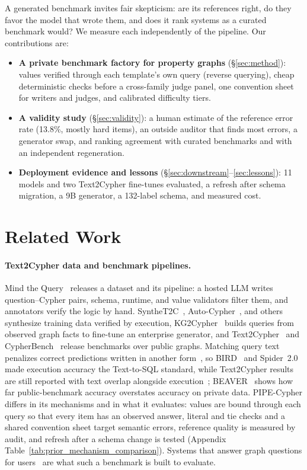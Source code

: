 \documentclass[11pt]{article}
\begin{document}
A generated benchmark invites fair skepticism: are its references right, do they favor the model that wrote them, and does it rank systems as a curated benchmark would? We measure each independently of the pipeline. Our contributions are:
\begin{itemize}\setlength\itemsep{1pt}
\item \textbf{A private benchmark factory for property graphs} (\S\ref{sec:method}): values verified through each template's own query (reverse querying), cheap deterministic checks before a cross-family judge panel, one convention sheet for writers and judges, and calibrated difficulty tiers.
\item \textbf{A validity study} (\S\ref{sec:validity}): a human estimate of the reference error rate (13.8\%, mostly hard items), an outside auditor that finds most errors, a generator swap, and ranking agreement with curated benchmarks and with an independent regeneration.
\item \textbf{Deployment evidence and lessons} (\S\ref{sec:downstream}--\ref{sec:lessons}): 11 models and two Text2Cypher fine-tunes evaluated, a refresh after schema migration, a 9B generator, a 132-label schema, and measured cost.
\end{itemize}

\section{Related Work}
\paragraph{Text2Cypher data and benchmark pipelines.} Mind the Query~\citep{mindthequery2025} releases a dataset and its pipeline: a hosted LLM writes question--Cypher pairs, schema, runtime, and value validators filter them, and annotators verify the logic by hand. SyntheT2C~\citep{synthet2c2025}, Auto-Cypher~\citep{autocypher2025}, and others~\citep{cazzaro2026grounded} synthesize training data verified by execution, KG2Cypher~\citep{kg2cypher} builds queries from observed graph facts to fine-tune an enterprise generator, and Text2Cypher~\citep{text2cypher2025,text2cypher2024dataset} and CypherBench~\citep{cypherbench2025,text2gqlbench2026} release benchmarks over public graphs. Matching query text penalizes correct predictions written in another form~\citep{zhong2020testsuites}, so BIRD~\citep{bird2023} and Spider~2.0~\citep{spider22024} made execution accuracy the Text-to-SQL standard, while Text2Cypher results are still reported with text overlap alongside execution~\citep{text2cypher2025}; BEAVER~\citep{beaver2024} shows how far public-benchmark accuracy overstates accuracy on private data. PIPE-Cypher differs in its mechanisms and in what it evaluates: values are bound through each query so that every item has an observed answer, literal and tie checks and a shared convention sheet target semantic errors, reference quality is measured by audit, and refresh after a schema change is tested (Appendix Table~\ref{tab:prior_mechanism_comparison}). Systems that answer graph questions for users~\citep{graphseek,segra,natnl2gql} are what such a benchmark is built to evaluate.
\end{document}
